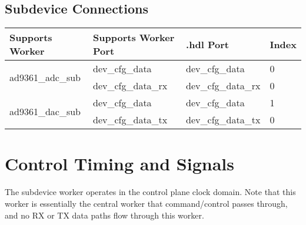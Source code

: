 \begin{landscape}
  \section{Subdevice Connections}
  \begin{scriptsize}
    \begin{tabular}{|p{5cm}|p{5cm}|p{5cm}|p{7.22cm}|}
      \hline
      \rowcolor{blue}
      Supports Worker  & Supports Worker Port & \comp{}.hdl Port   & Index \\
      \hline
      \multirow{2}{*}{ad9361\_adc\_sub} & dev\_cfg\_data       & dev\_cfg\_data     &0 \\
                       & dev\_cfg\_data\_rx   & dev\_cfg\_data\_rx &0 \\
      \hline
      \multirow{2}{*}{ad9361\_dac\_sub} & dev\_cfg\_data       & dev\_cfg\_data     &1 \\
                       & dev\_cfg\_data\_tx   & dev\_cfg\_data\_tx &0 \\
      \hline
    \end{tabular}
  \end{scriptsize}

\end{landscape}

\section{Control Timing and Signals}
The \Comp{} subdevice worker operates in the control plane clock domain. Note that this worker is essentially the central worker that command/control passes through, and no RX or TX data paths flow through this worker.

